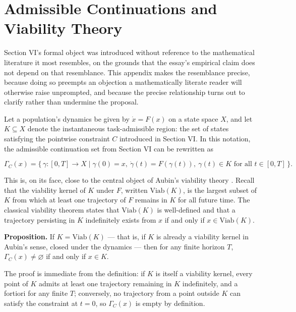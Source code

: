 \documentclass[11pt]{article}
\begin{document}
\appendix

\section{Admissible Continuations and Viability Theory}

Section VI's formal object was introduced without reference to the mathematical literature it most resembles, on the grounds that the essay's empirical claim does not depend on that resemblance. This appendix makes the resemblance precise, because doing so preempts an objection a mathematically literate reader will otherwise raise unprompted, and because the precise relationship turns out to clarify rather than undermine the proposal.

Let a population's dynamics be given by $\dot{x} = F(x)$ on a state space $X$, and let $K \subseteq X$ denote the instantaneous task-admissible region: the set of states satisfying the pointwise constraint $C$ introduced in Section VI. In this notation, the admissible continuation set from Section VI can be rewritten as

\[
\Gamma_C(x) = \{\, \gamma : [0,T] \to X \mid \gamma(0) = x,\ \dot\gamma(t) = F(\gamma(t)),\ \gamma(t) \in K \text{ for all } t \in [0,T] \,\}.
\]

This is, on its face, close to the central object of Aubin's viability theory \cite{Aubin1991}. Recall that the viability kernel of $K$ under $F$, written $\mathrm{Viab}(K)$, is the largest subset of $K$ from which at least one trajectory of $F$ remains in $K$ for all future time. The classical viability theorem states that $\mathrm{Viab}(K)$ is well-defined and that a trajectory persisting in $K$ indefinitely exists from $x$ if and only if $x \in \mathrm{Viab}(K)$.

\textbf{Proposition.} If $K = \mathrm{Viab}(K)$ — that is, if $K$ is already a viability kernel in Aubin's sense, closed under the dynamics — then for any finite horizon $T$, $\Gamma_C(x) \neq \varnothing$ if and only if $x \in K$.

The proof is immediate from the definition: if $K$ is itself a viability kernel, every point of $K$ admits at least one trajectory remaining in $K$ indefinitely, and a fortiori for any finite $T$; conversely, no trajectory from a point outside $K$ can satisfy the constraint at $t=0$, so $\Gamma_C(x)$ is empty by definition.
\end{document}

